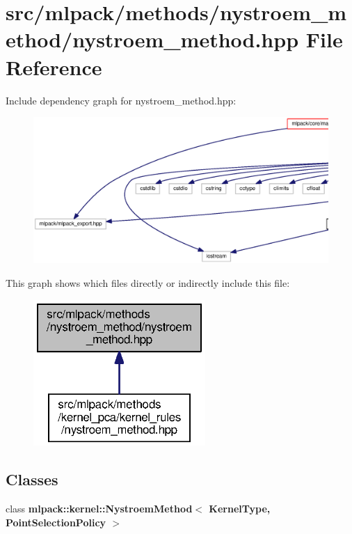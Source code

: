 \section{src/mlpack/methods/nystroem\+\_\+method/nystroem\+\_\+method.hpp File Reference}
\label{nystroem__method_2nystroem__method_8hpp}
Include dependency graph for nystroem\+\_\+method.\+hpp\+:
\nopagebreak
\begin{figure}[H]
\begin{center}
\leavevmode
\includegraphics[width=350pt]{nystroem__method_2nystroem__method_8hpp__incl}
\end{center}
\end{figure}
This graph shows which files directly or indirectly include this file\+:
\nopagebreak
\begin{figure}[H]
\begin{center}
\leavevmode
\includegraphics[width=185pt]{nystroem__method_2nystroem__method_8hpp__dep__incl}
\end{center}
\end{figure}
\subsection*{Classes}
\begin{DoxyCompactItemize}
\item 
class {\bf mlpack\+::kernel\+::\+Nystroem\+Method$<$ Kernel\+Type, Point\+Selection\+Policy $>$}
\end{DoxyCompactItemize}
